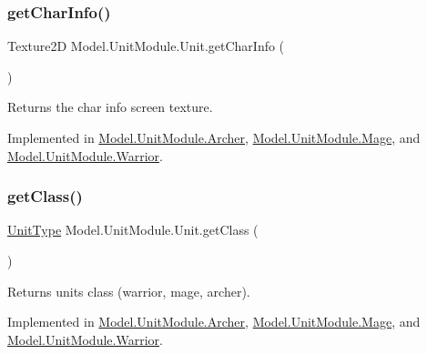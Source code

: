 \subsubsection{\texorpdfstring{get\+Char\+Info()}{getCharInfo()}}
{\footnotesize\ttfamily Texture2D Model.\+Unit\+Module.\+Unit.\+get\+Char\+Info (\begin{DoxyParamCaption}{ }\end{DoxyParamCaption})}

Returns the char info screen texture. 

Implemented in \hyperlink{class_model_1_1_unit_module_1_1_archer_acfcb3e900ee60c0bd9ed800efc9abcac}{Model.\+Unit\+Module.\+Archer}, \hyperlink{class_model_1_1_unit_module_1_1_mage_a6c9b2e9f98ed461b77559c1241407c94}{Model.\+Unit\+Module.\+Mage}, and \hyperlink{class_model_1_1_unit_module_1_1_warrior_a4b5e10506a23aff7acb02896e4762da7}{Model.\+Unit\+Module.\+Warrior}.

\hypertarget{interface_model_1_1_unit_module_1_1_unit_a84dbb2982a68ec530e53662d747da9fa}{}\label{interface_model_1_1_unit_module_1_1_unit_a84dbb2982a68ec530e53662d747da9fa} 
\subsubsection{\texorpdfstring{get\+Class()}{getClass()}}
{\footnotesize\ttfamily \hyperlink{namespace_model_1_1_unit_module_aba9769f408747bf38d0d8adca8f68c98}{Unit\+Type} Model.\+Unit\+Module.\+Unit.\+get\+Class (\begin{DoxyParamCaption}{ }\end{DoxyParamCaption})}

Returns unit\textquotesingle{}s class (warrior, mage, archer). 

Implemented in \hyperlink{class_model_1_1_unit_module_1_1_archer_a2211d99610a907939dac87cb75c3afb1}{Model.\+Unit\+Module.\+Archer}, \hyperlink{class_model_1_1_unit_module_1_1_mage_a1fa4709e8927042bfd858a330d8cba22}{Model.\+Unit\+Module.\+Mage}, and \hyperlink{class_model_1_1_unit_module_1_1_warrior_ad075c71e62a88cc0cd5f93c9600ac952}{Model.\+Unit\+Module.\+Warrior}.

\hypertarget{interface_model_1_1_unit_module_1_1_unit_accb79e396c6066707f2d11f63e3fdd99}{}\label{interface_model_1_1_unit_module_1_1_unit_accb79e396c6066707f2d11f63e3fdd99} 
